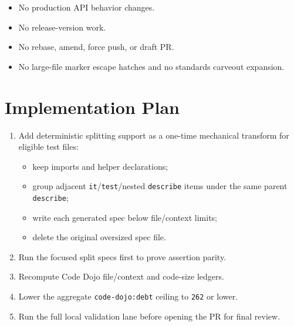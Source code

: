 \begin{itemize}
\tightlist
\item
  No production API behavior changes.
\item
  No release-version work.
\item
  No rebase, amend, force push, or draft PR.
\item
  No large-file marker escape hatches and no standards carveout expansion.
\end{itemize}

\section{Implementation Plan}\label{record-243-implementation-plan}

\begin{enumerate}
\def\labelenumi{\arabic{enumi}.}
\tightlist
\item
  Add deterministic splitting support as a one-time mechanical transform for eligible test files:

  \begin{itemize}
  \tightlist
  \item
    keep imports and helper declarations;
  \item
    group adjacent \texttt{i\allowbreak{}t}/\texttt{t\allowbreak{}e\allowbreak{}s\allowbreak{}t}/nested \texttt{d\allowbreak{}e\allowbreak{}s\allowbreak{}c\allowbreak{}r\allowbreak{}i\allowbreak{}b\allowbreak{}e} items under the same parent \texttt{d\allowbreak{}e\allowbreak{}s\allowbreak{}c\allowbreak{}r\allowbreak{}i\allowbreak{}b\allowbreak{}e};
  \item
    write each generated spec below file/context limits;
  \item
    delete the original oversized spec file.
  \end{itemize}
\item
  Run the focused split specs first to prove assertion parity.
\item
  Recompute Code Dojo file/context and code-size ledgers.
\item
  Lower the aggregate \texttt{c\allowbreak{}o\allowbreak{}d\allowbreak{}e\allowbreak{}-\allowbreak{}d\allowbreak{}o\allowbreak{}j\allowbreak{}o\allowbreak{}:\allowbreak{}d\allowbreak{}e\allowbreak{}b\allowbreak{}t} ceiling to \texttt{2\allowbreak{}6\allowbreak{}2} or lower.
\item
  Run the full local validation lane before opening the PR for final review.
\end{enumerate}

